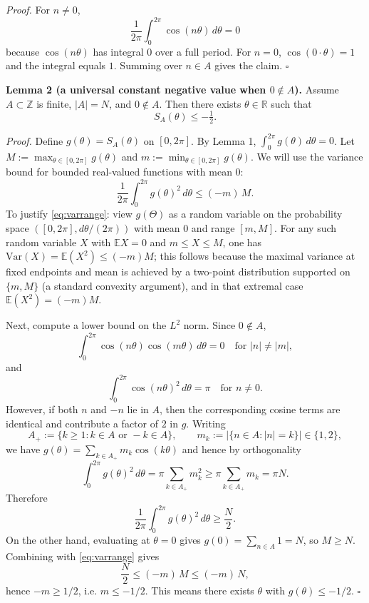 \textit{Proof.}
For $n\neq 0$,
\[
\frac{1}{2\pi}\int_0^{2\pi} \cos(n\theta)\,d\theta = 0
\]
because $\cos(n\theta)$ has integral $0$ over a full period. For $n=0$, $\cos(0\cdot\theta)=1$ and the integral equals $1$. Summing over $n\in A$ gives the claim.
\hfill$\square$

\medskip
\noindent\textbf{Lemma 2 (a universal constant negative value when $0\notin A$).}
Assume $A\subset\mathbb{Z}$ is finite, $|A|=N$, and $0\notin A$. Then there exists $\theta\in\mathbb{R}$ such that
\[
S_A(\theta)\le -\tfrac12.
\]

\textit{Proof.}
Define $g(\theta)=S_A(\theta)$ on $[0,2\pi]$. By Lemma 1, $\int_0^{2\pi} g(\theta)\,d\theta=0$.
Let $M:=\max_{\theta\in[0,2\pi]} g(\theta)$ and $m:=\min_{\theta\in[0,2\pi]} g(\theta)$.
We will use the variance bound for bounded real-valued functions with mean $0$:
\begin{equation}\label{eq:varrange}
\frac{1}{2\pi}\int_0^{2\pi} g(\theta)^2\,d\theta \le (-m)\,M.
\end{equation}
To justify \eqref{eq:varrange}: view $g(\Theta)$ as a random variable on the probability space $([0,2\pi], d\theta/(2\pi))$ with mean $0$ and range $[m,M]$. For any such random variable $X$ with $\mathbb{E}X=0$ and $m\le X\le M$, one has $\mathrm{Var}(X)=\mathbb{E}(X^2)\le (-m)M$; this follows because the maximal variance at fixed endpoints and mean is achieved by a two-point distribution supported on $\{m,M\}$ (a standard convexity argument), and in that extremal case $\mathbb{E}(X^2)=(-m)M$.

Next, compute a lower bound on the $L^2$ norm. Since $0\notin A$,
\[
\int_0^{2\pi} \cos(n\theta)\cos(m\theta)\,d\theta = 0\quad\text{for } |n|\neq |m|,
\]
and
\[
\int_0^{2\pi} \cos(n\theta)^2\,d\theta = \pi\quad\text{for }n\neq 0.
\]
However, if both $n$ and $-n$ lie in $A$, then the corresponding cosine terms are identical and contribute a factor of $2$ in $g$. Writing
\[
A_+:=\{k\ge 1: k\in A\text{ or }-k\in A\},\qquad m_k:=|\{n\in A: |n|=k\}|\in\{1,2\},
\]
we have $g(\theta)=\sum_{k\in A_+} m_k \cos(k\theta)$ and hence by orthogonality
\[
\int_0^{2\pi} g(\theta)^2\,d\theta = \pi\sum_{k\in A_+} m_k^2 \ge \pi\sum_{k\in A_+} m_k = \pi N.
\]
Therefore
\[
\frac{1}{2\pi}\int_0^{2\pi} g(\theta)^2\,d\theta \ge \frac{N}{2}.
\]
On the other hand, evaluating at $\theta=0$ gives $g(0)=\sum_{n\in A}1=N$, so $M\ge N$.
Combining with \eqref{eq:varrange} gives
\[
\frac{N}{2}\le (-m)\,M \le (-m)\,N,
\]
hence $-m\ge 1/2$, i.e. $m\le -1/2$. This means there exists $\theta$ with $g(\theta)\le -1/2$.
\hfill$\square$

